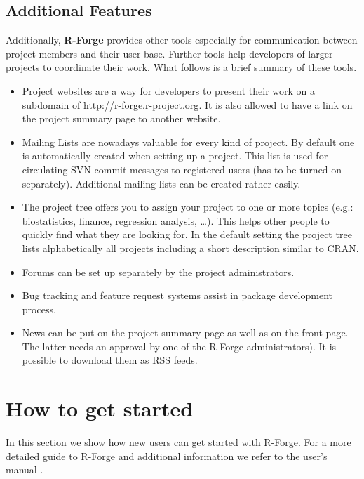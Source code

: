 \subsection{Additional Features}

Additionally, \textbf{R-Forge} provides other tools especially for
communication between project members and their user base. Further
tools help developers of larger projects to coordinate their work.
What follows is a brief summary of these tools.
\begin{itemize}
\item Project websites are a way for developers to present their work on a
subdomain of \url{http://r-forge.r-project.org}. It is also allowed to
have a link on the project summary page to another website. 
\item Mailing Lists are nowadays valuable for every kind of project. By
  default one is automatically created when setting up a project. This
  list is used for circulating SVN commit messages to registered
  users (has to be turned on separately). Additional mailing lists can be
  created rather easily. 
\item The project tree offers you to assign your project to one or more
  topics (e.g.: biostatistics, finance, regression analysis,
  \ldots). This helps other people to quickly find what they are
  looking for. In the default setting the project tree lists
  alphabetically all
  projects including a short description similar to CRAN.
\item Forums can be set up separately by the project
  administrators.%
\item Bug tracking and feature request systems assist in package
  development process.
\item News can be put on the project summary page as well as on the
  front page. The latter needs an approval by one of the R-Forge
  administrators). It is possible to download them as RSS feeds.
\end{itemize}

\section{How to get started}
In this section we show how new users can get started with
R-Forge. For a more detailed guide to R-Forge and additional
information we refer to the user's manual
\cite{theussl08:r_forge_users_manual}.

